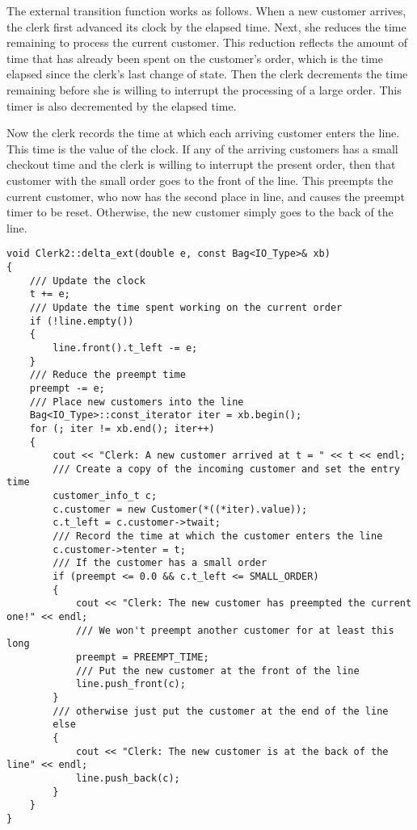 The external transition function works as follows. When a new customer arrives, the clerk first advanced its clock by the elapsed time. Next, she reduces the time remaining to process the current customer. This reduction reflects the amount of time that has already been spent on the customer's order, which is the time elapsed since the clerk's last change of state. Then the clerk decrements the time remaining before she is willing to interrupt the processing of a large order. This timer is also decremented by the elapsed time.

Now the clerk records the time at which each arriving customer enters the line. This time is the value of the clock. If any of the arriving customers has a small checkout time and the clerk is willing to interrupt the present order, then that customer with the small order goes to the front of the line. This preempts the current customer, who now has the second place in line, and causes the preempt timer to be reset. Otherwise, the new customer simply goes to the back of the line.
\begin{verbatim}
void Clerk2::delta_ext(double e, const Bag<IO_Type>& xb)
{
    /// Update the clock
    t += e;
    /// Update the time spent working on the current order
    if (!line.empty())
    {
        line.front().t_left -= e;
    }
    /// Reduce the preempt time
    preempt -= e;
    /// Place new customers into the line
    Bag<IO_Type>::const_iterator iter = xb.begin();
    for (; iter != xb.end(); iter++)
    {
        cout << "Clerk: A new customer arrived at t = " << t << endl;
        /// Create a copy of the incoming customer and set the entry time
        customer_info_t c;
        c.customer = new Customer(*((*iter).value));
        c.t_left = c.customer->twait;
        /// Record the time at which the customer enters the line
        c.customer->tenter = t;
        /// If the customer has a small order
        if (preempt <= 0.0 && c.t_left <= SMALL_ORDER)
        {
            cout << "Clerk: The new customer has preempted the current one!" << endl;
            /// We won't preempt another customer for at least this long
            preempt = PREEMPT_TIME;
            /// Put the new customer at the front of the line
            line.push_front(c);
        }
        /// otherwise just put the customer at the end of the line
        else 
        {
            cout << "Clerk: The new customer is at the back of the line" << endl;
            line.push_back(c);
        }
    }
}
\end{verbatim}

